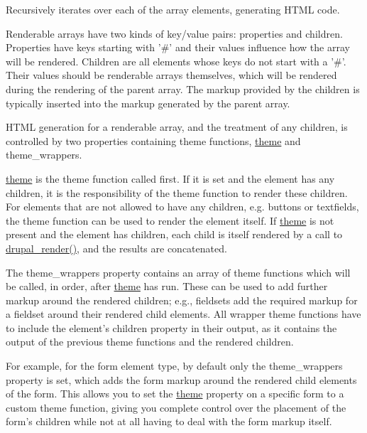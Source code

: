 Recursively iterates over each of the array elements, generating HTML code.

Renderable arrays have two kinds of key/value pairs: properties and children. Properties have keys starting with '\#' and their values influence how the array will be rendered. Children are all elements whose keys do not start with a '\#'. Their values should be renderable arrays themselves, which will be rendered during the rendering of the parent array. The markup provided by the children is typically inserted into the markup generated by the parent array.

HTML generation for a renderable array, and the treatment of any children, is controlled by two properties containing theme functions, \hyperlink{includes_2theme_8inc_a7c25609a935874541a19657affd30fff}{theme} and theme\_\-wrappers.

\hyperlink{includes_2theme_8inc_a7c25609a935874541a19657affd30fff}{theme} is the theme function called first. If it is set and the element has any children, it is the responsibility of the theme function to render these children. For elements that are not allowed to have any children, e.g. buttons or textfields, the theme function can be used to render the element itself. If \hyperlink{includes_2theme_8inc_a7c25609a935874541a19657affd30fff}{theme} is not present and the element has children, each child is itself rendered by a call to \hyperlink{common_8inc_a05798b44e8d6c496d4bee5cc32fa7851}{drupal\_\-render()}, and the results are concatenated.

The theme\_\-wrappers property contains an array of theme functions which will be called, in order, after \hyperlink{includes_2theme_8inc_a7c25609a935874541a19657affd30fff}{theme} has run. These can be used to add further markup around the rendered children; e.g., fieldsets add the required markup for a fieldset around their rendered child elements. All wrapper theme functions have to include the element's children property in their output, as it contains the output of the previous theme functions and the rendered children.

For example, for the form element type, by default only the theme\_\-wrappers property is set, which adds the form markup around the rendered child elements of the form. This allows you to set the \hyperlink{includes_2theme_8inc_a7c25609a935874541a19657affd30fff}{theme} property on a specific form to a custom theme function, giving you complete control over the placement of the form's children while not at all having to deal with the form markup itself.

